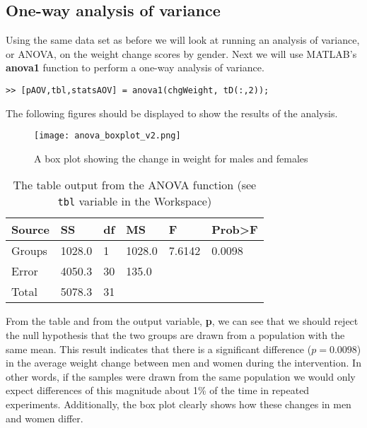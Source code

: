 \documentclass[12pt,a4paper]{article}
\begin{document}
\subsection{One-way analysis of variance}
Using the same data set as before we will look at running an analysis of variance, or ANOVA, on the weight change scores by gender.  
Next we will use MATLAB's \textbf{anova1} function to perform a one-way analysis of variance.
\begin{lstlisting}[style=Matlab-editor]		
>> [pAOV,tbl,statsAOV] = anova1(chgWeight, tD(:,2));
\end{lstlisting}
The following figures should be displayed to show the results of the analysis.
\begin{figure}[H]
	\begin{center}
		\texttt{[image: anova\_boxplot\_v2.png]}
		\caption{A box plot showing the change in weight for males and females}
		\label{fig:anova_boxplot}
	\end{center}
\end{figure}
\begin{table}[H]
	\begin{center}
		\begin{tabular}{llllll}
		\toprule
		Source 	& SS 	& df & MS & F &	Prob>F\\
		\midrule
		Groups 	& 1028.0	 & 1 & 1028.0 & 7.6142 & 0.0098\\
		Error 	& 4050.3 & 30 & 135.0 & 	& \\
		Total 	& 5078.3 & 31 & 	& 	& \\
		\bottomrule
		\end{tabular}
		\caption{The table output from the ANOVA function (see \texttt{tbl} variable in the Workspace)}
		\label{tab:anova_table}
	\end{center}
\end{table}
From the table and from the output variable, \textbf{p}, we can see that we should reject the null hypothesis that the two groups are drawn from a population with the same mean.  
This result indicates that there is a significant difference ($p = 0.0098$) in the average weight change between men and women during the intervention.
In other words, if the samples were drawn from the same population we would only expect differences of this magnitude about 1\% of the time in repeated experiments.
Additionally, the box plot clearly shows how these changes in men and women differ.
\end{document}
